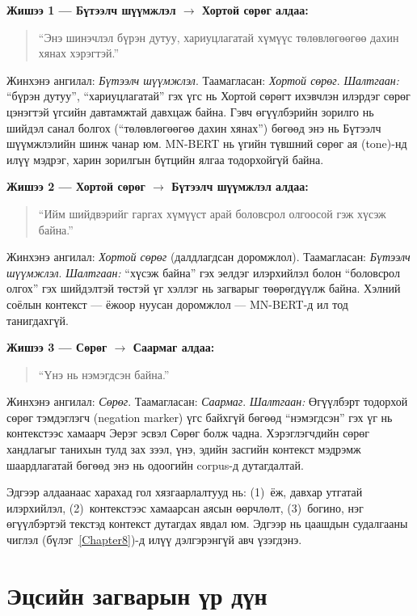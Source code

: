 \textbf{Жишээ 1 — Бүтээлч шүүмжлэл $\to$ Хортой сөрөг алдаа:}
\begin{quote}
``Энэ шинэчлэл бүрэн дутуу, хариуцлагатай хүмүүс төлөвлөгөөгөө дахин хянах
хэрэгтэй.''
\end{quote}
Жинхэнэ ангилал: \textit{Бүтээлч шүүмжлэл}. Таамагласан: \textit{Хортой сөрөг}.
\emph{Шалтгаан:} ``бүрэн дутуу'', ``хариуцлагатай'' гэх үгс нь Хортой сөрөгт ихэвчлэн
илэрдэг сөрөг цэнэгтэй үгсийн давтамжтай давхцаж байна. Гэвч өгүүлбэрийн
зорилго нь шийдэл санал болгох (``төлөвлөгөөгөө дахин хянах'') бөгөөд энэ нь
Бүтээлч шүүмжлэлийн шинж чанар юм. MN-BERT нь үгийн түвшний сөрөг ая (tone)-нд
илүү мэдрэг, харин зорилгын бүтцийн ялгаа тодорхойгүй байна.

\textbf{Жишээ 2 — Хортой сөрөг $\to$ Бүтээлч шүүмжлэл алдаа:}
\begin{quote}
``Ийм шийдвэрийг гаргах хүмүүст арай боловсрол олгоосой гэж хүсэж байна.''
\end{quote}
Жинхэнэ ангилал: \textit{Хортой сөрөг} (далдлагдсан доромжлол). Таамагласан: \textit{Бүтээлч шүүмжлэл}.
\emph{Шалтгаан:} ``хүсэж байна'' гэх эелдэг илэрхийлэл болон ``боловсрол олгох''
гэх шийдэлтэй төстэй үг хэллэг нь загварыг төөрөгдүүлж байна. Хэлний соёлын
контекст --- ёжоор нуусан доромжлол --- MN-BERT-д ил тод танигдахгүй.

\textbf{Жишээ 3 — Сөрөг $\to$ Саармаг алдаа:}
\begin{quote}
``Үнэ нь нэмэгдсэн байна.''
\end{quote}
Жинхэнэ ангилал: \textit{Сөрөг}. Таамагласан: \textit{Саармаг}.
\emph{Шалтгаан:} Өгүүлбэрт тодорхой сөрөг тэмдэглэгч (negation marker) үгс
байхгүй бөгөөд ``нэмэгдсэн'' гэх үг нь контекстээс хамаарч Эерэг эсвэл
Сөрөг болж чадна. Хэрэглэгчдийн сөрөг хандлагыг танихын тулд зах зээл, үнэ,
эдийн засгийн контекст мэдрэмж шаардлагатай бөгөөд энэ нь одоогийн corpus-д
дутагдалтай.

Эдгээр алдаанаас харахад гол хязгаарлалтууд нь: (1)~ёж, давхар утгатай
илэрхийлэл, (2)~контекстээс хамаарсан аясын өөрчлөлт, (3)~богино, нэг өгүүлбэртэй
текстэд контекст дутагдах явдал юм. Эдгээр нь цаашдын судалгааны чиглэл
(бүлэг~\ref{Chapter8})-д илүү дэлгэрэнгүй авч үзэгдэнэ.

\section{Эцсийн загварын үр дүн}
\label{sec:label-correction}

